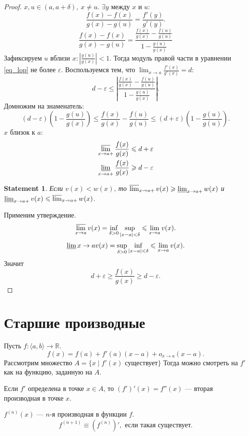 \documentclass[11pt]{book}
\newcommand{\R}{\mathbb{R}}
\renewcommand{\le}{\leqslant}
\renewcommand{\ge}{\geqslant}
\theoremstyle{definition}
\theoremstyle{plain}
\theoremstyle{plain}
\newtheorem*{st}{Statement}
\theoremstyle{definition}
\theoremstyle{remark}
\begin{document}
\begin{proof}
    $ x, u \in (a, a + \delta ), ~ x \ne  u$. $ \exists y$ между $ x$ и $ u$:
    \[
	\frac{f(x) - f(x)}{g(x) - g(u)} = \frac{f'(y)}{g'(y)}
    .\] 
    \begin{equation}\label{eq_lop}
	\frac{f(x) - f(x)}{g(x) - g(u)} = \frac{\frac{f(x)}{g(x)} - \frac{f(u)}{g(u)}}{1 - \frac{g(u)}{g(x)}}
    \end{equation}
    Зафиксируем $ u$ вблизи $ x: \left| \frac{g(u)}{g(x)} \right| < 1$.
    Тогда модуль правой части в уравнении  \ref{eq_lop} не более  $ \varepsilon $.
    Воспользуемся тем, что $ \lim_{x \to a} \frac{f'(x)}{g'(x)} = d $:
    \[
    d - \varepsilon  \le \left|
	\frac{\frac{f(x)}{g(x)} - \frac{f(u)}{g(u)}}{1 - \frac{g(u)}{g(x)}}\right|
    .\] 
    Домножим на знаменатель:
    \[
	(d- \varepsilon ) (1- \frac{g(u)}{g(x)}) \le \frac{f(x)}{g(x)} - \frac{f(u)}{g(u)} \le (d+ \varepsilon ) \left(1 - \frac{g(u)}{g(u)}\right)
    .\] 
    $ x$ близок к $ a$:
    \begin{align*}
	\varlimsup_{x \to  a+} \frac{f(x)}{g(x)} &\le d + \varepsilon \\
	\varliminf_{x \to a + } \frac{f(x)}{g(x)} &\ge d - \varepsilon  
    \end{align*}
    \begin{st}
	Если $ v(x) < w(x)$, то  $ \varlimsup_{x \to a+}v(x) \ge \varliminf_{x \to  a + } w(x)$ и $ \varliminf_{x \to  a+} v(x) \le \varlimsup_{x \to  a +}w(x)$.
    \end{st}
    Применим утверждение. 
    \[
	\varlimsup_{x \to  a} v(x) = \inf_{\delta>0}\sup_{|x - a| < \delta } \le \lim_{x \to  a}  v(x)
    .\] 
    \[
	\varliminf{x \to  a} v(x) = \sup_{\delta>0}\inf_{|x - a| < \delta } \le \lim_{x \to  a}  v(x)
    .\] 
    Значит
     \[
	 d + \varepsilon  \ge \frac{f(x)}{g(x)} \ge d - \varepsilon 
    .\] 
\end{proof}
\section{Старшие производные}
Пусть $ f: \langle a, b \rangle \to \R$.
\[
    f(x) = f(a) + f'(a)(x-a) + o_{x \to  a}(x-a)
.\] 
Рассмотрим множество $ A = \{x \mid f'(x) \text{ существует}\}$
Тогда можно смотреть на  $ f'$ как на функцию, заданную на  $ A$.
\begin{defn}
    Если $ f'$ определена в точке $ x \in A$, то $ (f')'(x) = f''(x)$ --- вторая производная в точке  $ x$.

    $ f^{(n)}(x)$ --- $ n$-я производная в функции $ f$.
     \[
	 f^{(n+1)} \equiv (f^{(n)})', \text{ если такая существует}
    .\] 
\end{defn}
\end{document}
